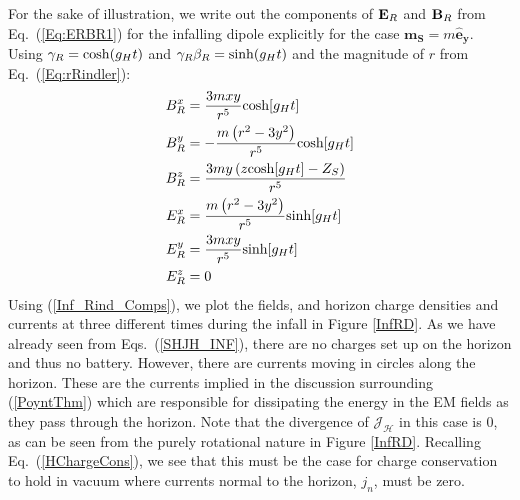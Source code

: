 For the sake of illustration, we write out the 
components of ${\bf E}_R$ and ${\bf B}_R$ from Eq.\ (\ref{Eq:ERBR1}) for the infalling dipole explicitly for
the case
$\mathbf{m_S} = m \mathbf{\hat{e}_y}$.
Using $\gamma_R=\cosh(g_Ht)$ and $\gamma_R\beta_R=\sinh(g_Ht)$ and the
magnitude of $r$ from Eq.\ (\ref{Eq:rRindler}):
\begin{align}
\label{Inf_Rind_Comps}
B_R^{x} &= \frac{3 m x y}{r^5} \hbox{cosh}[g_H t] \nonumber\\
B_R^{y} &= -\frac{ m \left(r^2-3y^2 \right)}{r^5} \hbox{cosh}[g_H t] \nonumber\\
B_R^{z} &=  \frac{3 m y\left(z \hbox{cosh}[g_H t] - Z_S\right)}{r^5}   \nonumber\\
E_R^{x} &=  \frac{ m \left(r^2-3y^2 \right)}{r^5} \hbox{sinh}[g_H t]  \nonumber\\
E_R^{y} &= \frac{3 m x y}{r^5} \hbox{sinh}[g_H t] \nonumber\\
E_R^{z} &=0  
\end{align}
Using (\ref{Inf_Rind_Comps}), we plot the fields, and horizon charge
densities and currents at three different times during the infall in
Figure \ref{InfRD}.  As we have already seen from Eqs.\
(\ref{SHJH_INF}), there are no charges set up on the horizon and thus no
battery. However, there are currents moving in circles along the
horizon. These are the currents implied in the discussion surrounding
(\ref{PoyntThm}) which are responsible for dissipating the energy in
the EM fields as they pass through the horizon. Note that the
divergence of $\mathbf{\mathcal{J}_\mathcal{H}}$ in this case is 0, as can be
seen from the purely rotational nature in Figure
\ref{InfRD}. Recalling Eq.\ (\ref{HChargeCons}), we see that this
must be the case for charge conservation to hold in vacuum where
currents normal to the horizon, $j_{n}$, must be zero.



